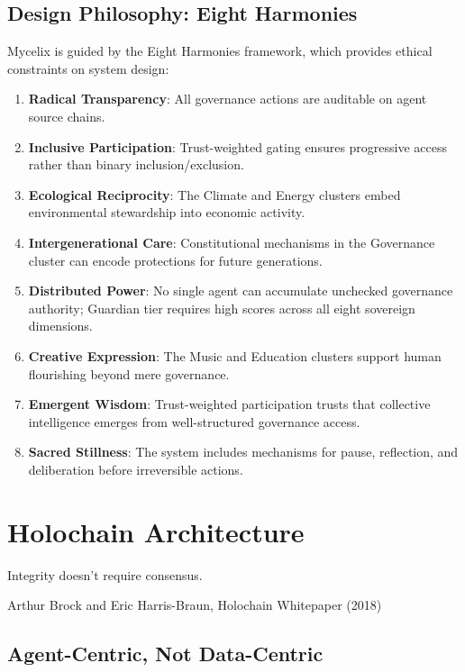 \documentclass[12pt]{book}
\begin{document}
\section{Design Philosophy: Eight Harmonies}

Mycelix is guided by the Eight Harmonies framework, which provides ethical
constraints on system design:

\begin{enumerate}
  \item \textbf{Radical Transparency}: All governance actions are auditable on
    agent source chains.
  \item \textbf{Inclusive Participation}: Trust-weighted gating ensures progressive
    access rather than binary inclusion/exclusion.
  \item \textbf{Ecological Reciprocity}: The Climate and Energy clusters embed
    environmental stewardship into economic activity.
  \item \textbf{Intergenerational Care}: Constitutional mechanisms in the Governance
    cluster can encode protections for future generations.
  \item \textbf{Distributed Power}: No single agent can accumulate unchecked
    governance authority; Guardian tier requires high scores across all eight sovereign dimensions.
  \item \textbf{Creative Expression}: The Music and Education clusters support
    human flourishing beyond mere governance.
  \item \textbf{Emergent Wisdom}: Trust-weighted participation trusts that collective
    intelligence emerges from well-structured governance access.
  \item \textbf{Sacred Stillness}: The system includes mechanisms for pause,
    reflection, and deliberation before irreversible actions.
\end{enumerate}


\chapter{Holochain Architecture}

\epigraph{Integrity doesn't require consensus.}{Arthur Brock and Eric Harris-Braun,
Holochain Whitepaper (2018)}

\section{Agent-Centric, Not Data-Centric}
\end{document}
